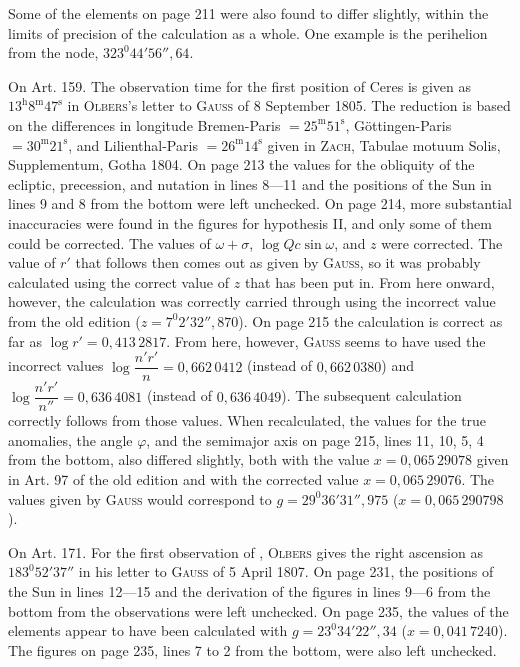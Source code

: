 Some of the elements on page 211 were also found to differ slightly, within the limits
of precision of the calculation as a whole. One example is the perihelion from the node,
$323^0 44' 56''{,}64$.

On Art. 159. The observation time for the first position of Ceres is given as
$13^{\mathrm h} 8^{\mathrm m} 47^{\mathrm s}$ in \textsc{Olbers}'s letter to \textsc{Gauss}
of 8 September 1805. The reduction is based on the differences in longitude Bremen-Paris
$= 25^{\mathrm m} 51^{\mathrm s}$, Göttingen-Paris $= 30^{\mathrm m} 21^{\mathrm s}$, and
Lilienthal-Paris $= 26^{\mathrm m} 14^{\mathrm s}$ given in \textsc{Zach}, Tabulae motuum
Solis, Supplementum, Gotha 1804. On page 213 the values for the obliquity of the ecliptic,
precession, and nutation in lines 8---11 and the positions of the Sun in lines 9 and 8
from the bottom were left unchecked. On page 214, more substantial inaccuracies were
found in the figures for hypothesis II, and only some of them could be corrected. The
values of $\omega+\sigma$, $\log Qc\sin\omega$, and $z$ were corrected. The value of $r'$
that follows then comes out as given by \textsc{Gauss}, so it was probably calculated
using the correct value of $z$ that has been put in. From here onward, however, the
calculation was correctly carried through using the incorrect value from the old edition
($z = 7^0 2' 32''{,}870$). On page 215 the calculation is correct as far as
$\log r' = 0{,}413\,2817$. From here, however, \textsc{Gauss} seems to have used the
incorrect values $\log\dfrac{n'r'}{n} = 0{,}662\,0412$ (instead of $0{,}662\,0380$) and
$\log\dfrac{n'r'}{n''} = 0{,}636\,4081$ (instead of $0{,}636\,4049$). The subsequent
calculation correctly follows from those values. When recalculated, the values for
the true anomalies, the angle $\varphi$, and the semimajor axis on page 215, lines
11, 10, 5, 4 from the bottom, also differed slightly, both with the
value $x = 0{,}065\,29078$ given in Art. 97 of the old edition and with the corrected
value $x = 0{,}065\,29076$. The values given by \textsc{Gauss} would correspond to
$g = 29^0 36' 31''{,}975$ ($x = 0{,}065\,290798$).

On Art. 171. For the first observation of , \textsc{Olbers} gives
the right ascension as $183^0 52' 37''$ in his letter to \textsc{Gauss} of 5 April 1807.
On page 231, the positions of the Sun in lines 12---15 and the derivation of the
figures in lines 9---6 from the bottom from the observations were left unchecked.
On page 235, the values of the elements appear to have been calculated with
$g = 23^0 34' 22''{,}34$ ($x = 0{,}041\,7240$). The figures on page 235, lines 7 to 2
from the bottom, were also left unchecked.

